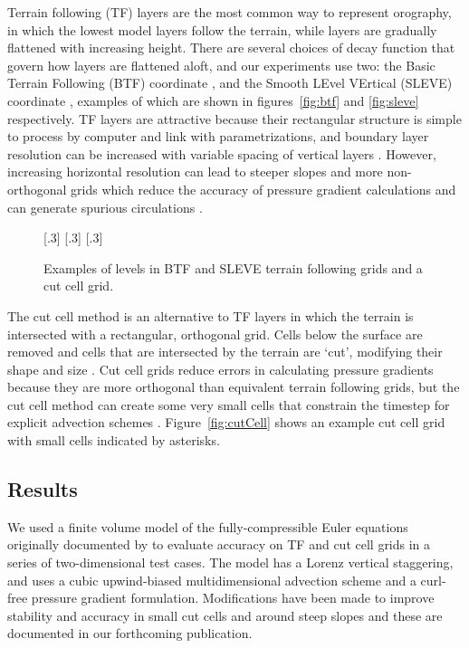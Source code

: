 \documentclass[a4paper]{article}
\begin{document}
Terrain following (TF) layers are the most common way to represent orography, in which the lowest model layers follow the terrain, while layers are gradually flattened with increasing height.  There are several choices of decay function that govern how layers are flattened aloft, and our experiments use two: the Basic Terrain Following (BTF) coordinate \citep{galchen-somerville1975}, and the Smooth LEvel VErtical (SLEVE) coordinate \citep{schaer2002}, examples of which are shown in figures~\ref{fig:btf} and \ref{fig:sleve} respectively.  TF layers are attractive because their rectangular structure is simple to process by computer and link with parametrizations, and boundary layer resolution can be increased with variable spacing of vertical layers \citep{schaer2002}.
However, increasing horizontal resolution can lead to steeper slopes and more non-orthogonal grids which reduce the accuracy of pressure gradient calculations and can generate spurious circulations \citep{dempsey-davis1998,klemp2011}.

\begin{figure}
	\centering
	\footnotesize
	[.3\linewidth]{}
	[.3\linewidth]{}
	[.3\linewidth]{}
%
	\caption{Examples of levels in BTF and SLEVE terrain following grids and a cut cell grid.}
	\label{fig:grids}
\end{figure}

The cut cell method is an alternative to TF layers in which the terrain is intersected with a rectangular, orthogonal grid.  Cells below the surface are removed and cells that are intersected by the terrain are `cut', modifying their shape and size \citep{adcroft1997}.  Cut cell grids reduce errors in calculating pressure gradients because they are more orthogonal than equivalent terrain following grids, but the cut cell method can create some very small cells that constrain the timestep for explicit advection schemes \citep{klein2009}.  Figure~\ref{fig:cutCell} shows an example cut cell grid with small cells indicated by asterisks.

\subsection{Results}
We used a finite volume model of the fully-compressible Euler equations originally documented by \citet{weller-shahrokhi2014} to evaluate accuracy on TF and cut cell grids in a series of two-dimensional test cases.  The model has a Lorenz vertical staggering, and uses a cubic upwind-biased multidimensional advection scheme and a curl-free pressure gradient formulation.  Modifications have been made to improve stability and accuracy in small cut cells and around steep slopes and these are documented in our forthcoming publication.
\end{document}

